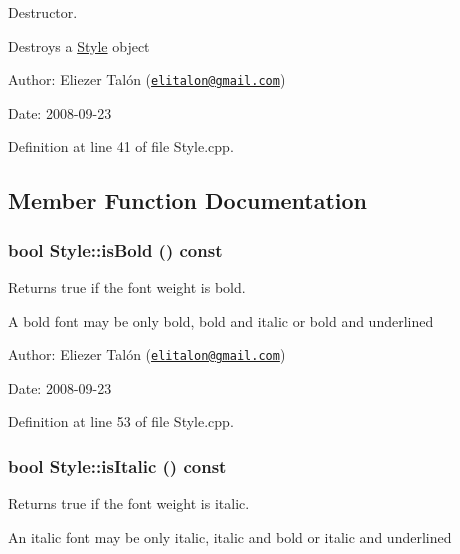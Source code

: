 Destructor. 

Destroys a \hyperlink{class_style}{Style} object

\begin{Desc}
\item[Author:]Eliezer Talón (\href{mailto:elitalon@gmail.com}{\tt elitalon@gmail.com}) \end{Desc}
\begin{Desc}
\item[Date:]2008-09-23 \end{Desc}


Definition at line 41 of file Style.cpp.

\subsection{Member Function Documentation}
\hypertarget{class_style_59d23709575c5e6e5434ef0af5ff94b6}{
\subsubsection[isBold]{\setlength{\rightskip}{0pt plus 5cm}bool Style::isBold () const}}
\label{class_style_59d23709575c5e6e5434ef0af5ff94b6}


Returns true if the font weight is bold. 

A bold font may be only bold, bold and italic or bold and underlined

\begin{Desc}
\item[Author:]Eliezer Talón (\href{mailto:elitalon@gmail.com}{\tt elitalon@gmail.com}) \end{Desc}
\begin{Desc}
\item[Date:]2008-09-23 \end{Desc}


Definition at line 53 of file Style.cpp.\hypertarget{class_style_5d57a686b93123e8ca5f8f91afb596c1}{
\subsubsection[isItalic]{\setlength{\rightskip}{0pt plus 5cm}bool Style::isItalic () const}}
\label{class_style_5d57a686b93123e8ca5f8f91afb596c1}


Returns true if the font weight is italic. 

An italic font may be only italic, italic and bold or italic and underlined

